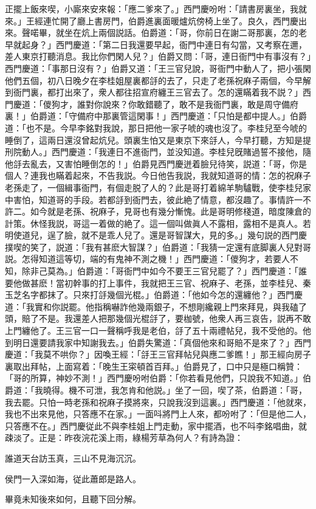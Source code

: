 正擺上飯來喫，小廝來安來報：「應二爹來了。」西門慶吩咐：「請書房裏坐，我就來。」王經連忙開了廳上書房門，伯爵進裏面暖爐炕傍椅上坐了。良久，西門慶出來。聲喏畢，就坐在炕上兩個説話。伯爵道：「哥，你前日在謝二哥那裏，怎的老早就起身？」西門慶道：「第二日我還要早起，衙門中連日有勾當，又考察在邇，差人東京打聽消息。我比你們閑人兒？」伯爵又問：「哥，連日衙門中有事沒有？」西門慶道：「事那日沒有？」伯爵又道：「王三官兒說，哥衙門中動人了，把小張閑他們五個，初八日晚夕在李桂姐屋裏都㧱的去了，只走了老孫祝麻子兩個，今早解到衙門裏，都打出來了，衆人都往招宣府纏王三官去了。怎的還瞞着我不説？」西門慶道：「儍狗才，誰對你說來？你敢錯聽了，敢不是我衙門裏，敢是周守備府裏！」伯爵道：「守備府中那裏管這閑事！」西門慶道：「只怕是都中提人。」伯爵道：「也不是。今早李銘對我說，那日把他一家子唬的魂也沒了。李桂兒至今唬的睡倒了，這兩日還沒曾起炕兒。頭裏生怕又是東京下來㧱人，今早打聽，方知是提刑院動人。」西門慶道：「我連日不進衙門，並没知道。李桂兒旣賭過誓不接他，隨他㧱去亂去，又害怕睡倒怎的！」伯爵見西門慶迸着臉兒待笑，説道：「哥，你是個人？連我也瞞着起來，不告我説。今日他告我説，我就知道哥的情：怎的祝麻子老孫走了，一個緝事衙門，有個走脱了人的？此是哥打着綿羊駒驢戰，使李桂兒家中害怕，知道哥的手段。若都㧱到衙門去，彼此絶了情意，都沒趣了。事情許一不許二。如今就是老孫、祝麻子，見哥也有幾分慚愧。此是哥明修棧道，暗度陳倉的計策。休怪我説，哥這一着做的絶了。這一個叫做眞人不露相，露相不是真人。若明使道兒，逞了臉，就不是乖人兒了。還是哥智謀大，見的多。」幾句説的西門慶撲喫的笑了，説道：「我有甚麽大智謀？」伯爵道：「我猜一定還有底脚裏人兒對哥説。怎得知道這等切，端的有鬼神不測之機！」西門慶道：「儍狗才，若要人不知，除非己莫為。」伯爵道：「哥衙門中如今不要王三官兒罷了？」西門慶道：「誰要他做甚麽！當初幹事的打上事件，我就把王三官、祝麻子、老孫，並李桂兒、秦玉芝名字都抹了。只來打㧱幾個光棍。」伯爵道：「他如今怎的還纏他？」西門慶道：「我實和你説罷。他指稱嚇詐他幾兩銀子，不想剛纔親上門來拜見，與我磕了頭，賠了不是。我還差人把那幾個光棍㧱了，要枷號，他衆人再三哀告，説再不敢上門纏他了。王三官一口一聲稱呼我是老伯，㧱了五十兩禮帖兒，我不受他的。他到明日還要請我家中知謝我去。」伯爵失驚道：「真個他來和哥賠不是來了？」西門慶道：「我莫不哄你？」因喚王經：「㧱王三官拜帖兒與應二爹瞧！」那王經向房子裏取出拜帖，上面寫着：「晚生王寀頓首百拜。」伯爵見了，口中只是極口稱贊：「哥的所算，神妙不測！」西門慶吩咐伯爵：「你若看見他們，只說我不知道。」伯爵道：「我曉得。機不可泄，我怎肯和他説。」坐了一回，喫了茶，伯爵道：「哥，我去罷。只怕一時老孫和祝麻子摸將來，只說我沒到這裏。」西門慶道：「他就來，我也不出來見他，只答應不在家。」一面呌將門上人來，都吩咐了：「但是他二人，只答應不在。」西門慶従此不與李桂姐上門走動，家中擺酒，也不呌李銘唱曲，就疎淡了。正是：昨夜浣花溪上雨，綠楊芳草為何人？有詩為證：

\begin{myquote}
誰道天台訪玉真，三山不見海沉沉。

侯門一入深如海，従此蕭郎是路人。
\end{myquote}

畢竟未知後來如何，且聽下回分解。

